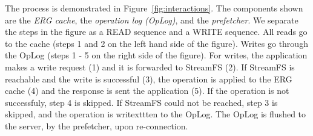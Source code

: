 
The process is demonstrated in Figure~\ref{fig:interactions}.  The components shown are the \emph{ERG cache}, the \emph{operation
log (OpLog)}, and the \emph{prefetcher}.  We separate the steps in the figure as a READ sequence and a WRITE sequence.
All reads go to the cache (steps 1 and 2 on the left hand side of the figure).  Writes go through the OpLog (steps 1 - 5 on the right
side of the figure).  For writes, 
the application makes a write request (1) and it is forwarded to StreamFS (2).  If StreamFS is reachable and the write is
successful (3), the operation is applied to the ERG cache (4) and the response is sent the application (5).
If the operation is not successfuly, step 4 is skipped.  If StreamFS could not be reached, step 3 is skipped, and the operation
is writexttten to the OpLog.  The OpLog is flushed to the server, by the prefetcher, upon re-connection. 



